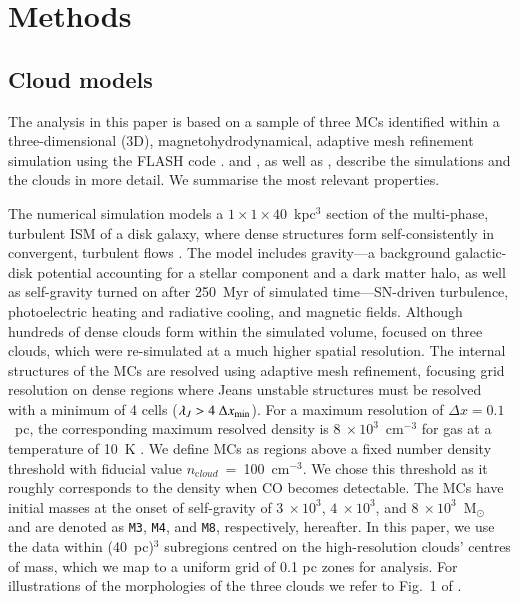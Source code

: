 \section{Methods}\label{methods}


\subsection{Cloud models}\label{methods:clouds}

The analysis in this paper is based on a sample of three MCs identified within a three-dimensional (3D), magnetohydrodynamical, adaptive mesh refinement simulation using the FLASH code \citep{Fryxell2000}.  
 and , as well as \citet[ hereafter]{Chira2018}, describe the simulations and the clouds in more detail. 
We summarise the most relevant properties. 

The numerical simulation models a $1\times1\times40$~kpc$^3$ section of the multi-phase, turbulent ISM of a disk galaxy, where dense structures form self-consistently in convergent, turbulent flows .  
The model includes 
           gravity---a 
background galactic-disk potential accounting for a stellar component and a dark matter halo, as well as self-gravity turned on after 250~Myr of simulated time---SN-driven turbulence, photoelectric heating and radiative cooling, and magnetic fields. 
Although hundreds of dense clouds form within the simulated volume,  focused on three clouds, which were re-simulated at a much higher spatial resolution.
The internal structures of the MCs are resolved using adaptive mesh refinement, focusing grid resolution on dense regions where Jeans unstable structures must be resolved with a minimum of 4 cells ($\lambda_J > 4~\Delta x_{\rm min}$).
For a maximum resolution of $\Delta x = 0.1$~pc, the corresponding maximum resolved density is $8~\times 10^3$~cm$^{-3}$ for gas at a temperature of 10~K . 
We define MCs as regions above a fixed number density threshold with fiducial value $n_{\mathrm cloud}$~=~100~cm$^{-3}$.
We chose this threshold as it roughly corresponds to the density when CO becomes detectable.
The MCs have initial masses at the onset of self-gravity of $3~\times 10^3$, $4~\times 10^3$, and $8~\times 10^3$~M$_{\odot}$ and are denoted as \texttt{M3}, \texttt{M4}, and \texttt{M8}, respectively, hereafter. 
In this paper, we use the data within (40~pc)$^{3}$ subregions centred on the high-resolution clouds' centres of mass, which we map to a uniform grid of 0.1 pc zones for analysis.
For illustrations of the morphologies of the three clouds we refer to Fig.~1 of .

